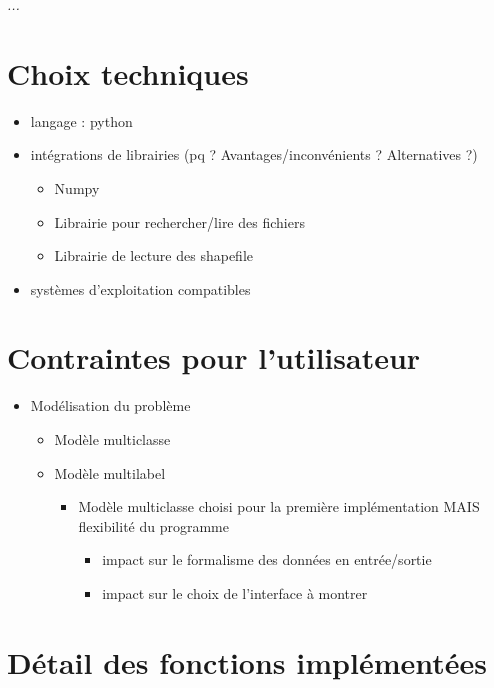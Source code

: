 
\textit{...}

\section{Choix techniques}

\begin{itemize}
	\item langage : python
	\item intégrations de librairies (pq ? Avantages/inconvénients ? Alternatives ?)
	\begin{itemize}
		\item Numpy
		\item Librairie pour rechercher/lire des fichiers
		\item Librairie de lecture des shapefile
	\end{itemize}
	\item systèmes d'exploitation compatibles
\end{itemize}

\section{Contraintes pour l'utilisateur}

\begin{itemize}
	\item Modélisation du problème 
	\begin{itemize}
		\item Modèle multiclasse
		\item Modèle multilabel
		\begin{itemize}
			\item Modèle multiclasse choisi pour la première implémentation MAIS flexibilité du programme
			\begin{itemize}
				\item impact sur le formalisme des données en entrée/sortie
				\item impact sur le choix de l'interface à montrer
			\end{itemize}
		\end{itemize}
	\end{itemize}
\end{itemize}


\section{Détail des fonctions implémentées}

